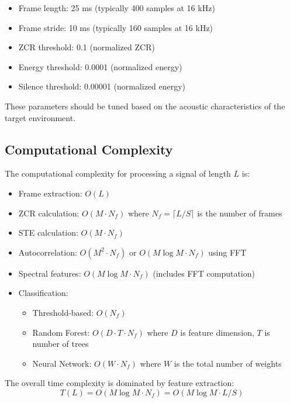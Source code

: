 \documentclass[10pt,journal,compsoc]{IEEEtran}
\begin{document}
\begin{itemize}
    \item Frame length: 25 ms (typically 400 samples at 16 kHz)
    \item Frame stride: 10 ms (typically 160 samples at 16 kHz)
    \item ZCR threshold: 0.1 (normalized ZCR)
    \item Energy threshold: 0.0001 (normalized energy)
    \item Silence threshold: 0.00001 (normalized energy)
\end{itemize}

These parameters should be tuned based on the acoustic characteristics of the target environment.

\subsection{Computational Complexity}
The computational complexity for processing a signal of length $L$ is:

\begin{itemize}
    \item Frame extraction: $O(L)$
    \item ZCR calculation: $O(M \cdot N_f)$ where $N_f = \lceil L/S \rceil$ is the number of frames
    \item STE calculation: $O(M \cdot N_f)$
    \item Autocorrelation: $O(M^2 \cdot N_f)$ or $O(M \log M \cdot N_f)$ using FFT
    \item Spectral features: $O(M \log M \cdot N_f)$ (includes FFT computation)
    \item Classification: 
        \begin{itemize}
            \item Threshold-based: $O(N_f)$
            \item Random Forest: $O(D \cdot T \cdot N_f)$ where $D$ is feature dimension, $T$ is number of trees
            \item Neural Network: $O(W \cdot N_f)$ where $W$ is the total number of weights
        \end{itemize}
\end{itemize}

The overall time complexity is dominated by feature extraction:
\begin{equation}
T(L) = O(M \log M \cdot N_f) = O(M \log M \cdot L/S)
\end{equation}
\end{document}
